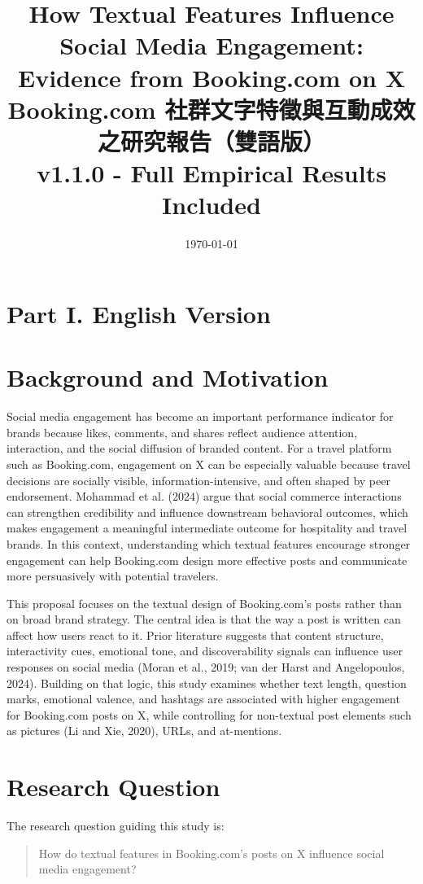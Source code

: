 \documentclass[12pt,a4paper,fontset=none]{ctexart}
\title{How Textual Features Influence Social Media Engagement:\\Evidence from Booking.com on X\\[0.5em]
\large Booking.com 社群文字特徵與互動成效之研究報告（雙語版）\\[0.5em]
\small v1.1.0 - Full Empirical Results Included}
\author{}
\date{\today}
\begin{document}
\maketitle
\tableofcontents
\newpage

\section*{Part I. English Version}

\section{Background and Motivation}
Social media engagement has become an important performance indicator for brands because likes, comments, and shares reflect audience attention, interaction, and the social diffusion of branded content. For a travel platform such as Booking.com, engagement on X can be especially valuable because travel decisions are socially visible, information-intensive, and often shaped by peer endorsement. Mohammad et al. (2024) argue that social commerce interactions can strengthen credibility and influence downstream behavioral outcomes, which makes engagement a meaningful intermediate outcome for hospitality and travel brands. In this context, understanding which textual features encourage stronger engagement can help Booking.com design more effective posts and communicate more persuasively with potential travelers.

This proposal focuses on the textual design of Booking.com's posts rather than on broad brand strategy. The central idea is that the way a post is written can affect how users react to it. Prior literature suggests that content structure, interactivity cues, emotional tone, and discoverability signals can influence user responses on social media (Moran et al., 2019; van der Harst and Angelopoulos, 2024). Building on that logic, this study examines whether text length, question marks, emotional valence, and hashtags are associated with higher engagement for Booking.com posts on X, while controlling for non-textual post elements such as pictures (Li and Xie, 2020), URLs, and at-mentions.

\section{Research Question}
The research question guiding this study is:

\begin{quote}
How do textual features in Booking.com's posts on X influence social media engagement?
\end{quote}
\end{document}

